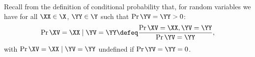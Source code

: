 \begin{definition}
  Recall from the definition of conditional probability that,
  for random variables 
  we have for all $\XX \in \X$, $\YY \in \Y$ such that $\Pr{\YV = \YY} > 0$:
  $$\Pr{\XV = \XX \mid \YV = \YY} \defeq \frac{\Pr{\XV = \XX, \YV = \YY}}{\Pr{\YV = \YY}},$$%
  with $\Pr{\XV = \XX \mid \YV = \YY}$ undefined if $\Pr{\YV = \YY} = 0$.
\end{definition}
